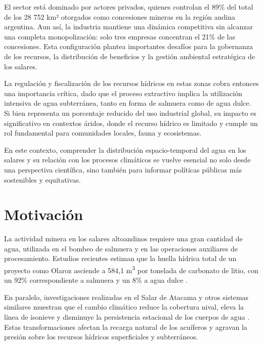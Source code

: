 El sector está dominado por actores privados, quienes controlan el 89\% del total de los 28 752 km² otorgados como concesiones mineras en la región andina argentina. Aun así, la industria mantiene una dinámica competitiva sin alcanzar una completa monopolización: solo tres empresas concentran el 21\% de las concesiones. Esta configuración plantea importantes desafíos para la gobernanza de los recursos, la distribución de beneficios y la gestión ambiental estratégica de los salares.

La regulación y fiscalización de los recursos hídricos en estas zonas cobra entonces una importancia crítica, dado que el proceso extractivo implica la utilización intensiva de agua subterránea, tanto en forma de salmuera como de agua dulce. Si bien representa un porcentaje reducido del uso industrial global, su impacto es significativo en contextos áridos, donde el recurso hídrico es limitado y cumple un rol fundamental para comunidades locales, fauna y ecosistemas.

En este contexto, comprender la distribución espacio-temporal del agua en los salares y su relación con los procesos climáticos se vuelve esencial no solo desde una perspectiva científica, sino también para informar políticas públicas más sostenibles y equitativas.



\section{Motivación}

La actividad minera en los salares altoandinos requiere una gran cantidad de agua, utilizada en el bombeo de salmuera y en las operaciones auxiliares de procesamiento. Estudios recientes estiman que la huella hídrica total de un proyecto como Olaroz asciende a 584,1 m\textsuperscript{3} por tonelada de carbonato de litio, con un 92\% correspondiente a salmuera y un 8\% a agua dulce \cite{lopezsteinmetz2024book}.

En paralelo, investigaciones realizadas en el Salar de Atacama y otros sistemas similares muestran que el cambio climático reduce la cobertura nival, eleva la línea de isonieve y disminuye la persistencia estacional de los cuerpos de agua \cite{saavedra2018changes}. Estas transformaciones afectan la recarga natural de los acuíferos y agravan la presión sobre los recursos hídricos superficiales y subterráneos.

